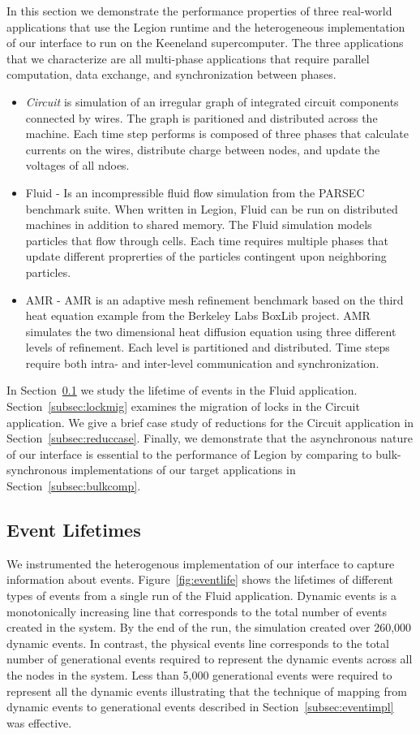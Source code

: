 In this section we demonstrate the performance properties of three
real-world applications that use the Legion runtime and the heterogeneous
implementation of our interface to run on the Keeneland supercomputer.
The three applications that we characterize are all multi-phase
applications that require parallel computation, data exchange, and
synchronization between phases. 
\begin{itemize} \itemsep1pt \parskip0pt 
\item {\em Circuit} is simulation of an irregular graph of integrated
circuit components connected by wires.  The graph is paritioned
and distributed across the machine.  Each time step performs is composed
of three phases that calculate currents on the wires, distribute charge between
nodes, and update the voltages of all ndoes.
\item Fluid - Is an incompressible fluid flow simulation from the PARSEC
benchmark suite\cite{bienia11benchmarking}.  When written in Legion, Fluid can
be run on distributed machines in addition to shared memory.  The Fluid simulation
models particles that flow through cells.  Each time requires multiple phases
that update different proprerties of the particles contingent upon neighboring
particles.
\item AMR - AMR is an adaptive mesh refinement benchmark based on the third heat
equation example from the Berkeley Labs BoxLib project\cite{BoxLib}.  AMR
simulates the two dimensional heat diffusion equation using three different levels
of refinement.  Each level is partitioned and distributed.  Time steps require
both intra- and inter-level communication and synchronization.
\end{itemize}
In Section~\ref{subsec:eventlife} we study the lifetime of events in
the Fluid application.  Section~\ref{subsec:lockmig} examines
the migration of locks in the Circuit application.  We give
a brief case study of reductions for the Circuit application
in Section~\ref{subsec:reduccase}.  Finally, we demonstrate
that the asynchronous nature of our interface is essential to the
performance of Legion by comparing to bulk-synchronous
implementations of our target applications in Section~\ref{subsec:bulkcomp}.
  
\subsection{Event Lifetimes}
\label{subsec:eventlife}
We instrumented the heterogenous implementation of our interface to 
capture information about events.  Figure~\ref{fig:eventlife} shows
the lifetimes of different types of events from a single run of the Fluid
application.  Dynamic events is a monotonically increasing line that
corresponds to the total number of events created in the system.  By
the end of the run, the simulation created over 260,000 dynamic
events.  In contrast, the physical events line corresponds to the total number
of generational events required to represent the dynamic events 
across all the nodes in the system.  Less than 5,000
generational events were required to represent all the dynamic events
illustrating that the technique of mapping from dynamic events to generational 
events described in Section~\ref{subsec:eventimpl} was effective.

